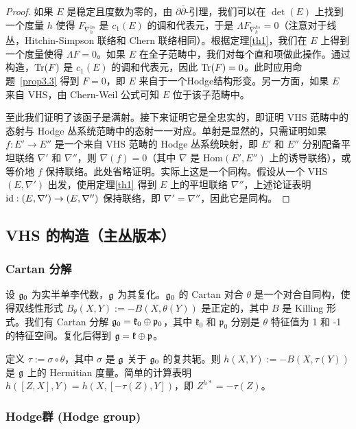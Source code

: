 \begin{proof}
如果 $E$ 是稳定且度数为零的，由 $\partial\bar{\partial}$-引理，我们可以在 $\det(E)$ 上找到一个度量 $h$ 使得 $F_{\nabla_h^{hs}}$ 是 $c_1(E)$ 的调和代表元，于是 $\Lambda F_{\nabla_h^{hs}} = 0$（注意对于线丛，Hitchin-Simpson 联络和 Chern 联络相同）。根据定理\ref{th1}，我们在 $E$ 上得到一个度量使得 $\Lambda F = 0$。如果 $E$ 在全子范畴中，我们对每个直和项做此操作。通过构造，$\operatorname{Tr}(F)$ 是 $c_1(E)$ 的调和代表元，因此 $\operatorname{Tr}(F)=0$。此时应用命题~\ref{prop3.3} 得到 $F=0$，即 $E$ 来自于一个Hodge结构形变。另一方面，如果 $E$ 来自 VHS，由 Chern-Weil 公式可知 $E$ 位于该子范畴中。

至此我们证明了该函子是满射。接下来证明它是全忠实的，即证明 VHS 范畴中的态射与 Hodge 丛系统范畴中的态射一一对应。单射是显然的，只需证明如果 $f: E' \to E''$ 是一个来自 VHS 范畴的 Hodge 丛系统映射，即 $E'$ 和 $E''$ 分别配备平坦联络 $\nabla'$ 和 $\nabla''$，则 $\nabla(f)=0$（其中 $\nabla$ 是 $\text{Hom}(E', E'')$ 上的诱导联络），或等价地 $f$ 保持联络。此处省略证明。实际上这是一个同构。假设从一个 VHS $(E, \nabla')$ 出发，使用定理\ref{th1} 得到 $E$ 上的平坦联络 $\nabla''$，上述论证表明 $\mathrm{id}: (E, \nabla') \to (E, \nabla'')$ 保持联络，即 $\nabla' = \nabla''$，因此它是同构。
\end{proof}

\subsection{VHS 的构造（主丛版本）}

\subsubsection*{Cartan 分解}

设 $\mathfrak{g}_0$ 为实半单李代数，$\mathfrak{g}$ 为其复化。$\mathfrak{g}_0$ 的 Cartan 对合 $\theta$ 是一个对合自同构，使得双线性形式 $B_\theta(X, Y) := -B(X, \theta(Y))$ 是正定的，其中 $B$ 是 Killing 形式。我们有 Cartan 分解 $\mathfrak{g}_0 = \mathfrak{k}_0 \oplus \mathfrak{p}_0$，其中 $\mathfrak{k}_0$ 和 $\mathfrak{p}_0$ 分别是 $\theta$ 特征值为 1 和 -1 的特征空间。复化后得到 $\mathfrak{g} = \mathfrak{k} \oplus \mathfrak{p}$。

定义 $\tau := \sigma \circ \theta$，其中 $\sigma$ 是 $\mathfrak{g}$ 关于 $\mathfrak{g}_0$ 的复共轭。则 $h(X, Y) := -B(X, \tau(Y))$ 是 $\mathfrak{g}$ 上的 Hermitian 度量。简单的计算表明 $h([Z, X], Y) = h(X, [-\tau(Z), Y])$，即 $Z^{h*} = -\tau(Z)$。

\subsubsection*{Hodge群 (Hodge group)}

